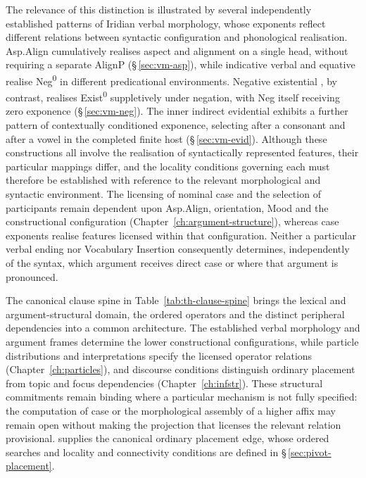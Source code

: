The relevance of this distinction is illustrated by several independently
established patterns of Iridian verbal morphology, whose exponents reflect
different relations between syntactic configuration and phonological
realisation. Asp.Align cumulatively realises aspect and alignment on a
single head, without requiring a separate AlignP (§\,\ref{sec:vm-asp}),
while indicative verbal  and equative  realise
Neg\textsuperscript{0} in different predicational environments. Negative
existential , by contrast, realises Exist\textsuperscript{0}
suppletively under negation, with Neg itself receiving zero exponence
(§\,\ref{sec:vm-neg}). The inner indirect evidential exhibits a further
pattern of contextually conditioned exponence, selecting  after a
consonant and  after a vowel in the completed finite host
(§\,\ref{sec:vm-evid}). Although these constructions all involve the
realisation of syntactically represented features, their particular mappings
differ, and the locality conditions governing each must therefore be
established with reference to the relevant morphological and syntactic
environment. The licensing of nominal case and the selection of participants
remain dependent upon Asp.Align, orientation, Mood and the constructional
configuration (Chapter~\ref{ch:argument-structure}), whereas case exponents
realise features licensed within that configuration. Neither a particular
verbal ending nor Vocabulary Insertion consequently determines,
independently of the syntax, which argument receives direct case or where
that argument is pronounced.

The canonical clause spine in Table~\ref{tab:th-clause-spine} brings the
lexical and argument-structural domain, the ordered operators and the distinct
peripheral dependencies into a common architecture. The established verbal
morphology and argument frames determine the lower constructional
configurations, while particle distributions and interpretations specify the
licensed operator relations (Chapter~\ref{ch:particles}), and discourse
conditions distinguish ordinary placement from topic and focus dependencies
(Chapter~\ref{ch:infstr}). These structural commitments remain binding
where a particular mechanism is not fully specified: the computation of case
or the morphological assembly of a higher affix may remain open without
making the projection that licenses the relevant relation provisional.
 supplies the canonical ordinary placement edge, whose ordered
searches and locality and connectivity conditions are defined in
§\,\ref{sec:pivot-placement}.

